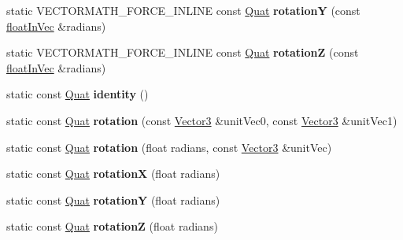 \begin{DoxyCompactItemize}
static V\+E\+C\+T\+O\+R\+M\+A\+T\+H\+\_\+\+F\+O\+R\+C\+E\+\_\+\+I\+N\+L\+I\+NE const \hyperlink{classVectormath_1_1Aos_1_1Quat}{Quat} {\bfseries rotationY} (const \hyperlink{classVectormath_1_1floatInVec}{float\+In\+Vec} \&radians)
\item 
\mbox{\label{classVectormath_1_1Aos_1_1Quat_a98e09f63c0c30535933928203b67e307}} 
static V\+E\+C\+T\+O\+R\+M\+A\+T\+H\+\_\+\+F\+O\+R\+C\+E\+\_\+\+I\+N\+L\+I\+NE const \hyperlink{classVectormath_1_1Aos_1_1Quat}{Quat} {\bfseries rotationZ} (const \hyperlink{classVectormath_1_1floatInVec}{float\+In\+Vec} \&radians)
\item 
\mbox{\label{classVectormath_1_1Aos_1_1Quat_ab553fa51545d2a4df531bee913c610dc}} 
static const \hyperlink{classVectormath_1_1Aos_1_1Quat}{Quat} {\bfseries identity} ()
\item 
\mbox{\label{classVectormath_1_1Aos_1_1Quat_ad4d8db2b4c7f290e92ab2d29e122f9a6}} 
static const \hyperlink{classVectormath_1_1Aos_1_1Quat}{Quat} {\bfseries rotation} (const \hyperlink{classVectormath_1_1Aos_1_1Vector3}{Vector3} \&unit\+Vec0, const \hyperlink{classVectormath_1_1Aos_1_1Vector3}{Vector3} \&unit\+Vec1)
\item 
\mbox{\label{classVectormath_1_1Aos_1_1Quat_a9e5f2d1f8fcce1ad4b74ec55ea872ec3}} 
static const \hyperlink{classVectormath_1_1Aos_1_1Quat}{Quat} {\bfseries rotation} (float radians, const \hyperlink{classVectormath_1_1Aos_1_1Vector3}{Vector3} \&unit\+Vec)
\item 
\mbox{\label{classVectormath_1_1Aos_1_1Quat_aacd4310a21602a1041c8d563e1e02781}} 
static const \hyperlink{classVectormath_1_1Aos_1_1Quat}{Quat} {\bfseries rotationX} (float radians)
\item 
\mbox{\label{classVectormath_1_1Aos_1_1Quat_a74de33fd4592ac97d102e9334bb6f29b}} 
static const \hyperlink{classVectormath_1_1Aos_1_1Quat}{Quat} {\bfseries rotationY} (float radians)
\item 
\mbox{\label{classVectormath_1_1Aos_1_1Quat_a7bc308b781629e197acb388b0e40a725}} 
static const \hyperlink{classVectormath_1_1Aos_1_1Quat}{Quat} {\bfseries rotationZ} (float radians)

\end{DoxyCompactItemize}
